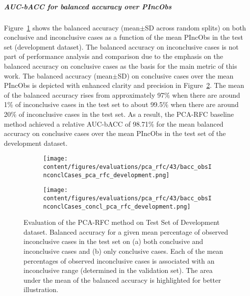 \subparagraph{AUC-bACC for balanced accuracy over PIncObs}

Figure~\ref{fig:bacc_obsInconclCases_pca_rfc_development} shows the balanced accuracy (mean$\pm$SD across random splits) 
on both conclusive and inconclusive cases as a function of the mean PIncObs
in the test set (development dataset).
The balanced accuracy on inconclusive cases is not part of performance analysis and comparison 
due to the emphasis on the balanced accuracy on conclusive cases as the basis for the main metric of this work.
The balanced accuracy (mean$\pm$SD) on conclusive cases over the mean PIncObs
is depicted with enhanced clarity and precision in Figure~\ref{fig:bacc_obsInconclCases_concl_pca_rfc_development}.
The mean of the balanced accuracy rises from approximately 97\% 
when there are around 1\% of inconclusive cases in the test set to about 99.5\% 
when there are around 20\% of inconclusive cases in the test set.
As a result, the PCA-RFC baseline method achieved a relative AUC-bACC of 98.71\% for the mean balanced accuracy on conclusive cases
over the mean PIncObs in the test set of the development dataset.


\begin{figure}[ht]
  \begin{subfigure}{0.5\textwidth}
    \centering
    \texttt{[image: content/figures/evaluations/pca\_rfc/43/bacc\_obsInconclCases\_pca\_rfc\_development.png]}
    \subcaption{}
    \label{fig:bacc_obsInconclCases_pca_rfc_development}
  \end{subfigure}
  \hfill
  \begin{subfigure}{0.5\textwidth}
    \centering
    \texttt{[image: content/figures/evaluations/pca\_rfc/43/bacc\_obsInconclCases\_concl\_pca\_rfc\_development.png]}
    \subcaption{}
    \label{fig:bacc_obsInconclCases_concl_pca_rfc_development}
  \end{subfigure}

  \caption{Evaluation of the PCA-RFC method on Test Set of Development dataset.
  Balanced accuracy for a given mean percentage of observed inconclusive cases in the test set on 
  (a) both conclusive and inconclusive cases and (b) only conclusive cases. 
  Each of the mean percentages of observed inconclusive cases is associated with an inconclusive range (determined in the validation set). 
  The area under the mean of the balanced accuracy is highlighted for better illustration.}
  \label{fig:bacc_obsInconclCases_pca_rfc_development_full}
\end{figure}

